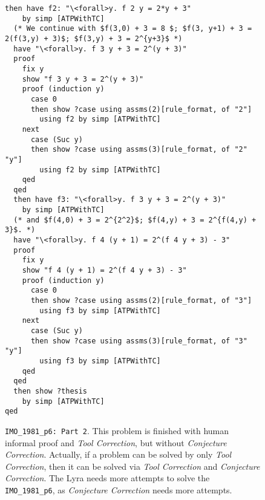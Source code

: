 \documentclass{article} \usepackage{iclr2024_conference,times}
\def\methodOneFull{\textit{Tool Correction}\xspace}
\def\methodTwoFull{\textit{Conjecture Correction}\xspace}
\def\shortname{Lyra\xspace}
\begin{document}
\begin{figure}[H]
\begin{tcolorbox}[colback=mybrown!5!white,colframe=mybrown!75!black]
\begin{small}

\begin{lstlisting}[style=isabelle]
  then have f2: "\<forall>y. f 2 y = 2*y + 3"
    by simp [ATPWithTC]
  (* We continue with $f(3,0) + 3 = 8 $; $f(3, y+1) + 3 = 2(f(3,y) + 3)$; $f(3,y) + 3 = 2^{y+3}$ *)
  have "\<forall>y. f 3 y + 3 = 2^(y + 3)"
  proof
    fix y
    show "f 3 y + 3 = 2^(y + 3)"
    proof (induction y)
      case 0
      then show ?case using assms(2)[rule_format, of "2"]
        using f2 by simp [ATPWithTC]
    next
      case (Suc y)
      then show ?case using assms(3)[rule_format, of "2" "y"]
        using f2 by simp [ATPWithTC]
    qed
  qed
  then have f3: "\<forall>y. f 3 y + 3 = 2^(y + 3)"
    by simp [ATPWithTC]
  (* and $f(4,0) + 3 = 2^{2^2}$; $f(4,y) + 3 = 2^{f(4,y) + 3}$. *)
  have "\<forall>y. f 4 (y + 1) = 2^(f 4 y + 3) - 3"
  proof
    fix y
    show "f 4 (y + 1) = 2^(f 4 y + 3) - 3"
    proof (induction y)
      case 0
      then show ?case using assms(2)[rule_format, of "3"]
        using f3 by simp [ATPWithTC]
    next
      case (Suc y)
      then show ?case using assms(3)[rule_format, of "3" "y"]
        using f3 by simp [ATPWithTC]
    qed
  qed
  then show ?thesis
    by simp [ATPWithTC]
qed

\end{lstlisting}
\end{small}
\end{tcolorbox}
\caption{
\small
\texttt{IMO\_1981\_p6: Part 2}. This problem is finished with human informal proof and \methodOneFull, but without \methodTwoFull. Actually, if a problem can be solved by only \methodOneFull, then it can be solved via \methodOneFull and \methodTwoFull. The \shortname needs more attempts to solve the \texttt{IMO\_1981\_p6}, as \methodTwoFull needs more attempts.}
\label{fig:case_study imo 1981 p6 Part 2}
\end{figure}
\end{document}
